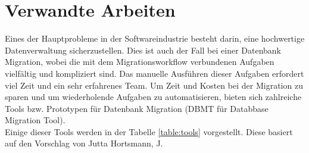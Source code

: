 \section{Verwandte Arbeiten}
\label{verwandte}
Eines der Hauptprobleme in der Softwareindustrie besteht darin, eine hochwertige Datenverwaltung sicherzustellen. Dies ist auch der Fall bei einer Datenbank Migration, wobei die mit dem Migrationsworkflow verbundenen Aufgaben vielfältig und kompliziert sind. Das manuelle Ausführen dieser Aufgaben erfordert viel Zeit und ein sehr erfahrenes Team. Um Zeit und Kosten bei der Migration zu sparen und um wiederholende Aufgaben zu automatisieren, bieten sich zahlreiche Tools bzw. Prototypen für Datenbank Migration (DBMT für Databbase Migration Tool). \\
Einige dieser Tools werden in der Tabelle \ref{table:tools} vorgestellt. Diese basiert auf den Vorschlag von Jutta Hortsmann, J.

